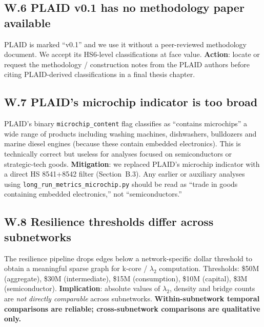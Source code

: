 \documentclass[11pt,a4paper]{article}
\begin{document}
\subsection*{W.6 PLAID v0.1 has no methodology paper available}

\begin{warnbox}
PLAID is marked ``v0.1'' and we use it without a peer-reviewed
methodology document. We accept its HS6-level classifications at face
value.
\textbf{Action}: locate or request the methodology / construction notes
from the PLAID authors before citing PLAID-derived classifications in a
final thesis chapter.
\end{warnbox}

\subsection*{W.7 PLAID's microchip indicator is too broad}

\begin{warnbox}
PLAID's binary \texttt{microchip\_content} flag classifies as ``contains
microchips'' a wide range of products including washing machines,
dishwashers, bulldozers and marine diesel engines (because these contain
embedded electronics). This is technically correct but useless for
analyses focused on semiconductors or strategic-tech goods.
\textbf{Mitigation}: we replaced PLAID's microchip indicator with a
direct HS 8541+8542 filter (Section~B.3). Any earlier or auxiliary
analyses using \texttt{long\_run\_metrics\_microchip.py} should be read
as ``trade in goods containing embedded electronics,'' not
``semiconductors.''
\end{warnbox}

\subsection*{W.8 Resilience thresholds differ across subnetworks}

\begin{warnbox}
The resilience pipeline drops edges below a network-specific dollar
threshold to obtain a meaningful sparse graph for k-core / $\lambda_2$
computation. Thresholds: \$50M (aggregate), \$30M (intermediate),
\$15M (consumption), \$10M (capital), \$3M (semiconductor).
\textbf{Implication}: absolute values of $\lambda_2$, density and
bridge counts are \emph{not directly comparable} across subnetworks.
\textbf{Within-subnetwork temporal comparisons are reliable;
cross-subnetwork comparisons are qualitative only.}
\end{warnbox}
\end{document}
